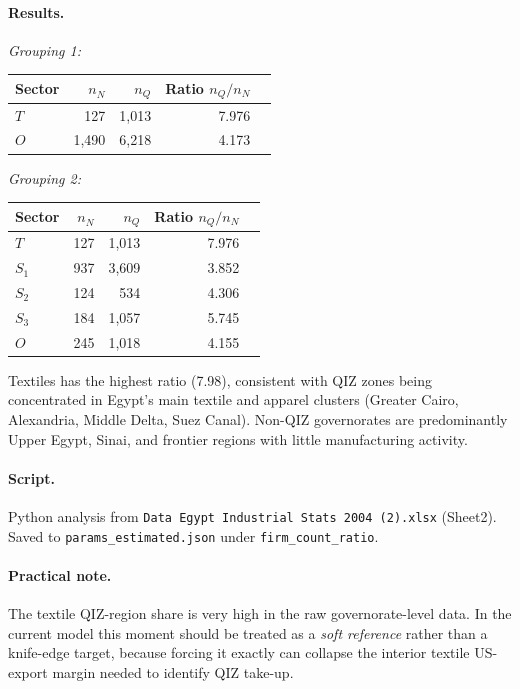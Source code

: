\documentclass[12pt]{article}
\begin{document}
\paragraph{Results.}

\medskip
\noindent\textit{Grouping 1:}
\begin{center}
\begin{tabular}{lrrrr}
\toprule
Sector & $n_N$ & $n_Q$ & Ratio $n_Q/n_N$ \\
\midrule
$T$ & 127  & 1,013 & 7.976 \\
$O$ & 1,490 & 6,218 & 4.173 \\
\bottomrule
\end{tabular}
\end{center}

\noindent\textit{Grouping 2:}
\begin{center}
\begin{tabular}{lrrrr}
\toprule
Sector & $n_N$ & $n_Q$ & Ratio $n_Q/n_N$ \\
\midrule
$T$   & 127   & 1,013 & 7.976 \\
$S_1$ & 937   & 3,609 & 3.852 \\
$S_2$ & 124   & 534   & 4.306 \\
$S_3$ & 184   & 1,057 & 5.745 \\
$O$   & 245   & 1,018 & 4.155 \\
\bottomrule
\end{tabular}
\end{center}

\noindent Textiles has the highest ratio (7.98), consistent with QIZ zones
being concentrated in Egypt's main textile and apparel clusters
(Greater Cairo, Alexandria, Middle Delta, Suez Canal). Non-QIZ governorates
are predominantly Upper Egypt, Sinai, and frontier regions with little
manufacturing activity.

\paragraph{Script.}
Python analysis from \texttt{Data Egypt Industrial Stats 2004 (2).xlsx}
(Sheet2). Saved to \texttt{params\_estimated.json} under
\texttt{firm\_count\_ratio}.

\paragraph{Practical note.}
The textile QIZ-region share is very high in the raw governorate-level data.
In the current model this moment should be treated as a \emph{soft reference}
rather than a knife-edge target, because forcing it exactly can collapse the
interior textile US-export margin needed to identify QIZ take-up.
\end{document}
